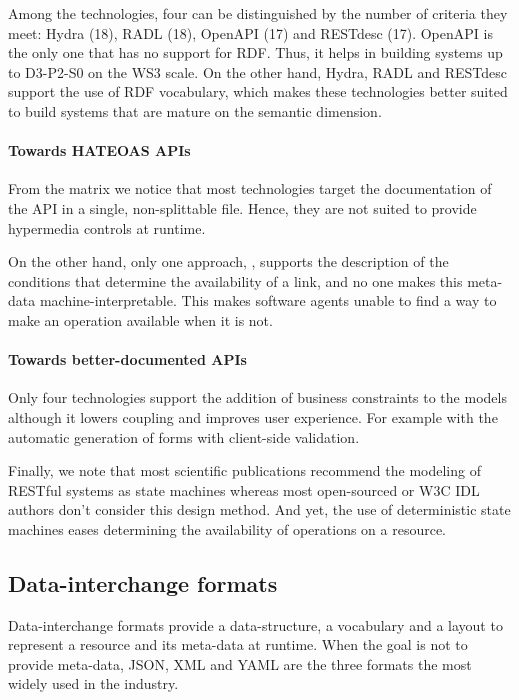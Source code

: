 Among the technologies, four can be distinguished by the number of criteria they meet: Hydra (18), RADL (18), OpenAPI (17) and RESTdesc (17).
OpenAPI is the only one that has no support for RDF. Thus, it helps in building systems up to D3-P2-S0 on the WS3 scale.
On the other hand, Hydra, RADL and RESTdesc support the use of RDF vocabulary, which makes these technologies better suited to build systems that are mature on the semantic dimension.

\paragraph{Towards HATEOAS APIs}
From the matrix we notice that most technologies target the documentation of the API in a single, non-splittable file. Hence, they are not suited to provide hypermedia controls at runtime.

On the other hand, only one approach, \cite{Schreier:2011:MRA:1967428.1967434}, supports the description of the conditions that determine the availability of a link, and no one makes this meta-data machine-interpretable. This makes software agents unable to find a way to make an operation available when it is not.

\paragraph{Towards better-documented APIs}
Only four technologies support the addition of business constraints to the models although it lowers coupling and improves user experience. For example with the automatic generation of forms with client-side validation.

Finally, we note that most scientific publications recommend the modeling of RESTful systems as state machines whereas most open-sourced or W3C IDL authors don't consider this design method. And yet, the use of deterministic state machines eases determining the availability of operations on a resource.

\subsection{Data-interchange formats}

Data-interchange formats provide a data-structure, a vocabulary and a layout to represent a resource and its meta-data at runtime. When the goal is not to provide meta-data, JSON, XML and YAML are the three formats the most widely used in the industry.

